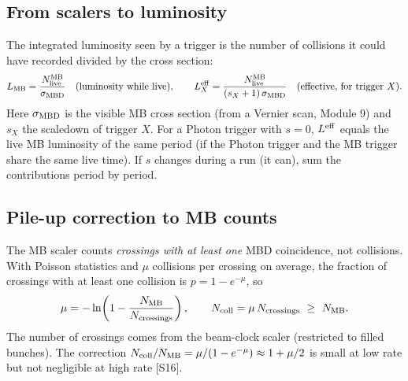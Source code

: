 \documentclass[11pt,letterpaper]{article}
\begin{document}
\subsection{From scalers to luminosity}
The integrated luminosity seen by a trigger is the number of collisions it could have recorded divided by the cross section:
\begin{equation}
L_{\rm MB}=\frac{N^{\rm MB}_{\rm live}}{\sigma_{\rm MBD}}\quad(\text{luminosity while live}),\qquad L^{\rm eff}_{X}=\frac{N^{\rm MB}_{\rm live}}{(s_X+1)\,\sigma_{\rm MBD}}\quad(\text{effective, for trigger }X).
\end{equation}
Here $\sigma_{\rm MBD}$ is the visible MB cross section (from a Vernier scan, Module 9) and $s_X$ the scaledown of trigger $X$.
For a Photon trigger with $s=0$, $L^{\rm eff}$ equals the live MB luminosity of the same period (if the Photon trigger and the MB trigger share the same live time).
If $s$ changes during a run (it can), sum the contributions period by period.

\subsection{Pile-up correction to MB counts}
The MB scaler counts \emph{crossings with at least one} MBD coincidence, not collisions.
With Poisson statistics and $\mu$ collisions per crossing on average, the fraction of crossings with at least one collision is $p=1-e^{-\mu}$, so
\begin{equation}
\mu=-\ln\!\left(1-\frac{N_{\rm MB}}{N_{\rm crossings}}\right),\qquad N_{\rm coll}=\mu\,N_{\rm crossings}\ \ge\ N_{\rm MB}.
\end{equation}
The number of crossings comes from the beam-clock scaler (restricted to filled bunches).
The correction $N_{\rm coll}/N_{\rm MB}=\mu/(1-e^{-\mu})\approx1+\mu/2$ is small at low rate but not negligible at high rate [S16].
\end{document}
